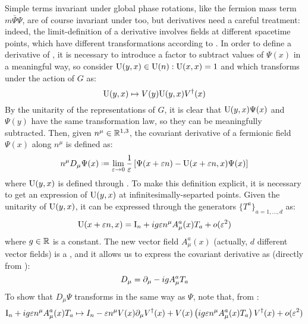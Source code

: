 Simple terms invariant under global phase rotations, like the fermion mass term $ m \bar{\Psi} \Psi $, are of course invariant under  too, but derivatives need a careful treatment: indeed, the limit-definition of a derivative involves fields at different spacetime points, which have different transformations according to . In order to define a derivative of \Psi, it is necessary to introduce a factor to subtract values of $ \Psi(x) $ in a meaningful way, so consider $ \mathrm{U}(y,x) \in \mathrm{U}(n) : \mathrm{U}(x,x) = 1 $ and which transforms under the action of $ G $ as:
\begin{equation}
  \mathrm{U}(y,x) \mapsto V(y) \mathrm{U}(y,x) V^\dagger(x)
  \label{eq:fac-cov-der}
\end{equation}
By the unitarity of the representations of $ G $, it is clear that $ \mathrm{U}(y,x) \Psi(x) $ and $ \Psi(y) $ have the same transformation law, so they can be meaningfully subtracted. Then, given $ n^\mu \in \mathbb{R}^{1,3} $, the covariant derivative of a fermionic field $ \Psi(x) $ along $ n^\mu $ is defined as:
\begin{equation}
  n^\mu D_\mu \Psi(x) \defeq \lim_{\varepsilon \rightarrow 0} \frac{1}{\varepsilon} \left[ \Psi(x + \varepsilon n) - \tens{U}(x + \varepsilon n, x) \Psi(x) \right]
  \label{eq:cov-der-def}
\end{equation}
where $ \mathrm{U}(y,x) $ is defined through . To make this definition explicit, it is necessary to get an expression of $ \mathrm{U}(y,x) $ at infinitesimally-separted points. Given the unitarity of $ \mathrm{U}(y,x) $, it can be expressed through the generators $ \{T^a\}_{a = 1, \dots, d} $ as:
\begin{equation}
  \mathrm{U}(x + \varepsilon n, x) = \mathrm{I}_n + i g \varepsilon n^\mu A_\mu^a(x) T_a + o(\varepsilon^2)
  \label{eq:fac-cov-der-exp}
\end{equation}
where $ g \in \mathbb{R} $ is a constant. The new vector field $ A_\mu^a(x) $ (actually, $ d $ different vector fields) is a , and it allows us to express the covariant derivative as (directly from ):
\begin{equation}
  D_\mu = \partial_\mu - i g A_\mu^a T_a
\end{equation}
To show that $ D_\mu \Psi $ transforms in the same way as $ \Psi $, note that, from :
\begin{equation*}
  \mathrm{I}_n + i g \varepsilon n^\mu A_\mu^a(x) T_a \mapsto I_n - \varepsilon n^\mu V(x) \partial_\mu V^\dagger(x) + V(x) \left( i g \varepsilon n^\mu A_\mu^a(x) T_a \right) V^\dagger(x) + o(\varepsilon^2)
\end{equation*}
